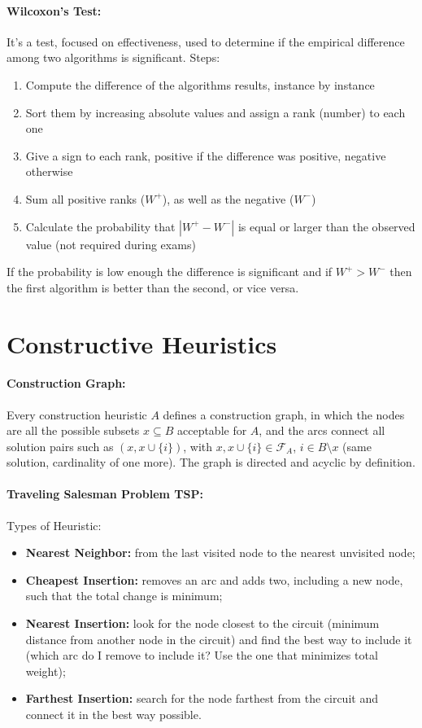 \documentclass{article}
\begin{document}
	\paragraph{Wilcoxon's Test:} It's a test, focused on effectiveness, used to determine if the empirical difference among two algorithms is significant. Steps:
	\begin{enumerate}
		\item Compute the difference of the algorithms results, instance by instance
		\item Sort them by increasing absolute values and assign a rank (number) to each one
		\item Give a sign to each rank, positive if the difference was positive, negative otherwise
		\item Sum all positive ranks ($W^+$), as well as the negative ($W^-$)
		\item Calculate the probability that $|W^+ - W^-|$ is equal or larger than the observed value (not required during exams)
	\end{enumerate}
	If the probability is low enough the difference is significant and if $W^+ > W^-$ then the first algorithm is better than the second, or vice versa.\\
	
	\section*{Constructive Heuristics}
	
	\paragraph{Construction Graph:} Every construction heuristic $A$ defines a construction graph, in which the nodes are all the possible subsets $x \subseteq B$ acceptable for $A$, and the arcs connect all solution pairs such as $(x, x \cup \{i\})$, with $x, x \cup \{i\} \in \mathcal{F}_A$, $i \in B \setminus x$ (same solution, cardinality of one more). The graph is directed and acyclic by definition.\\
	
	\paragraph{Traveling Salesman Problem TSP:} Types of Heuristic: 
	\begin{itemize}
		\item \textbf{Nearest Neighbor:} from the last visited node to the nearest unvisited node;
		\item \textbf{Cheapest Insertion:} removes an arc and adds two, including a new node, such that the total change is minimum;
		\item \textbf{Nearest Insertion:} look for the node closest to the circuit (minimum distance from another node in the circuit) and find the best way to include it (which arc do I remove to include it? Use the one that minimizes total weight);
		\item \textbf{Farthest Insertion:} search for the node farthest from the circuit and connect it in the best way possible.\\
	\end{itemize}
	
\end{document}
